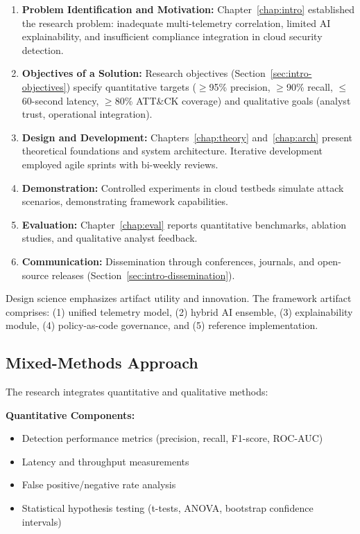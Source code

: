 \begin{enumerate}
    \item \textbf{Problem Identification and Motivation:} Chapter~\ref{chap:intro} established the research problem: inadequate multi-telemetry correlation, limited AI explainability, and insufficient compliance integration in cloud security detection.
    \item \textbf{Objectives of a Solution:} Research objectives (Section~\ref{sec:intro-objectives}) specify quantitative targets ($\geq$95\% precision, $\geq$90\% recall, $\leq$60-second latency, $\geq$80\% ATT\&CK coverage) and qualitative goals (analyst trust, operational integration).
    \item \textbf{Design and Development:} Chapters~\ref{chap:theory} and~\ref{chap:arch} present theoretical foundations and system architecture. Iterative development employed agile sprints with bi-weekly reviews.
    \item \textbf{Demonstration:} Controlled experiments in cloud testbeds simulate attack scenarios, demonstrating framework capabilities.
    \item \textbf{Evaluation:} Chapter~\ref{chap:eval} reports quantitative benchmarks, ablation studies, and qualitative analyst feedback.
    \item \textbf{Communication:} Dissemination through conferences, journals, and open-source releases (Section~\ref{sec:intro-dissemination}).
\end{enumerate}

Design science emphasizes artifact utility and innovation. The framework artifact comprises: (1) unified telemetry model, (2) hybrid AI ensemble, (3) explainability module, (4) policy-as-code governance, and (5) reference implementation.

\subsection{Mixed-Methods Approach}
The research integrates quantitative and qualitative methods:

\textbf{Quantitative Components:}
\begin{itemize}
    \item Detection performance metrics (precision, recall, F1-score, ROC-AUC)
    \item Latency and throughput measurements
    \item False positive/negative rate analysis
    \item Statistical hypothesis testing (t-tests, ANOVA, bootstrap confidence intervals)
\end{itemize}

